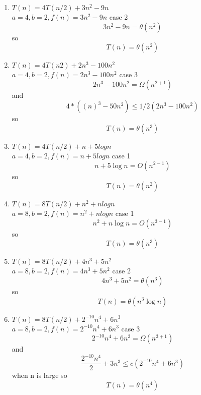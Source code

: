 \documentclass[11pt]{article}
\begin{document}
	\begin{enumerate}
		\item $T(n) = 4T(n/2) + 3n^2 - 9n$\\
			$a = 4, b =2, f(n) = 3n^2 -9n$
			case 2
			$$3n^2 - 9n = \theta(n^2)$$
			so
			$$T(n) = \theta(n^2)$$
		\item $T(n) = 4T(n2) + 2n^3 - 100 n^2$\\
			$a = 4, b =2,f(n) = 2n^3 - 100 n^2$	case 3
			$$2n^3 - 100n^2 = \Omega(n^{2+1})$$
			and
			$$4 * ((n) ^ 3 - 50n^2) \leq 1/2 (2n^3 - 100 n^2) $$
			so
			$$T(n) = \theta(n^3)$$
		\item $T(n) = 4T(n/2) + n + 5 log n$\\
			$a = 4 , b= 2, f(n) = n + 5 log n$ case 1
			$$n + 5 \log n = O(n^{2 -1})$$
			so
			$$T(n) = \theta(n^2)$$
		\item $T(n) = 8T(n/2) + n^2 + n log n$\\
			$a = 8 , b= 2, f(n) = n^2 + n log n$ case 1
			$$n^2 + n \log n = O(n^{3 -1})$$
			so
			$$T(n) = \theta(n^3)$$
		\item $T(n) = 8T(n/2) + 4n^3 + 5n^2$\\
			$a = 8 , b= 2, f(n) = 4n^3 + 5n^2$ case 2
			$$4n^3 + 5n^2 = \theta(n^{3})$$
			so
			$$T(n) = \theta(n^3\log n)$$
			
		\item $T(n) = 8T(n/2) + 2^{-10} n^4 + 6n^3$\\
			$a = 8 , b= 2, f(n) = 2^{-10} n^4 + 6n^3$	case 3
			$$ 2^{-10} n^4 + 6n^3 = \Omega(n^{3+1})$$
			and
			$$ \frac{2^{-10} n^4}{2} + 3n^3 \leq c (2^{-10} n^4 + 6n^3)$$
			when n is large
			so
			$$T(n) = \theta(n^4)$$	
	\end{enumerate}
	\bigskip
	
\end{document}
